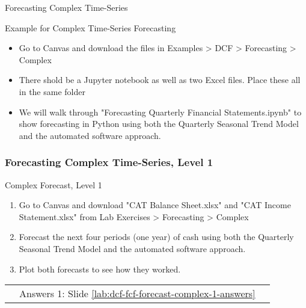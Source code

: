 \documentclass[handout, 11pt]{beamer}
\begin{document}
\begin{section}{Forecasting Complex Time-Series}
\begin{frame}
{\begin{block}{Example for Complex Time-Series Forecasting}
\begin{itemize}
\item Go to Canvas and download the files in Examples > DCF > Forecasting > Complex
\item There shold be a Jupyter notebook as well as two Excel files. Place these all in the same folder
\item We will walk through "Forecasting Quarterly Financial Statements.ipynb" to show forecasting in Python using both the Quarterly Seasonal Trend Model and the automated software approach.
\end{itemize}
\end{block}
}
\end{frame}
\begin{frame}
\frametitle{Forecasting Complex Time-Series, Level 1}
{
\begin{block}{Complex Forecast, Level 1}
\begin{enumerate}
\item Go to Canvas and download "CAT Balance Sheet.xlsx" and "CAT Income Statement.xlsx" from Lab Exercises > Forecasting > Complex
\item Forecast the next four periods (one year) of cash using both the Quarterly Seasonal Trend Model and the automated software approach.
\item Plot both forecasts to see how they worked.
\end{enumerate}
\vfill
\begin{tabular*}{\textwidth}{@{\extracolsep{\fill}}ccc}
\toprule
\hfill & Answers 1: Slide \textcolor{blue}{\underline{\ref{lab:dcf-fcf-forecast-complex-1-answers}}} & \hfill\\

\end{tabular*}
\end{block}
}
\label{lab:dcf-fcf-forecast-complex-1}
\end{frame}
\end{section}
\end{document}
